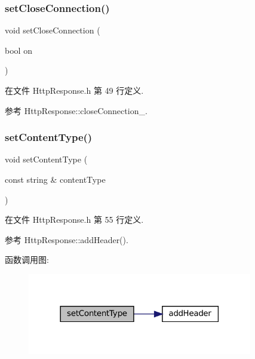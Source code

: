 \subsubsection{\texorpdfstring{set\+Close\+Connection()}{setCloseConnection()}}
{\footnotesize\ttfamily void set\+Close\+Connection (\begin{DoxyParamCaption}\item[{bool}]{on }\end{DoxyParamCaption})\hspace{0.3cm}{\ttfamily [inline]}}



在文件 Http\+Response.\+h 第 49 行定义.



参考 Http\+Response\+::close\+Connection\+\_\+.

\mbox{\label{classmuduo_1_1net_1_1HttpResponse_a1d3cf167b4c287497e4c38c78a0f1809}} 
\subsubsection{\texorpdfstring{set\+Content\+Type()}{setContentType()}}
{\footnotesize\ttfamily void set\+Content\+Type (\begin{DoxyParamCaption}\item[{const string \&}]{content\+Type }\end{DoxyParamCaption})\hspace{0.3cm}{\ttfamily [inline]}}



在文件 Http\+Response.\+h 第 55 行定义.



参考 Http\+Response\+::add\+Header().

函数调用图\+:
\nopagebreak
\begin{figure}[H]
\begin{center}
\leavevmode
\includegraphics[width=278pt]{classmuduo_1_1net_1_1HttpResponse_a1d3cf167b4c287497e4c38c78a0f1809_cgraph}
\end{center}
\end{figure}
\mbox{\label{classmuduo_1_1net_1_1HttpResponse_ad1aabf915b59756bb018249928221787}} 
